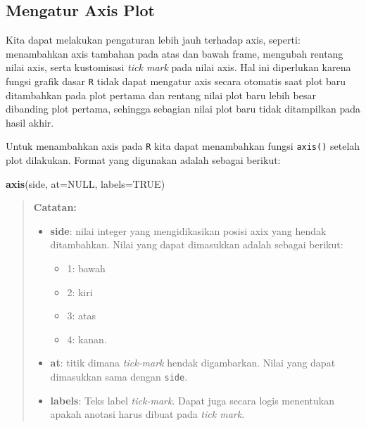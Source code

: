 \documentclass[
]{book}
\newenvironment{Shaded}{\begin{snugshade}}{\end{snugshade}}
\newcommand{\AttributeTok}[1]{\textcolor[rgb]{0.13,0.29,0.53}{#1}}
\newcommand{\ConstantTok}[1]{\textcolor[rgb]{0.56,0.35,0.01}{#1}}
\newcommand{\FunctionTok}[1]{\textcolor[rgb]{0.13,0.29,0.53}{\textbf{#1}}}
\newcommand{\NormalTok}[1]{#1}
\providecommand{\tightlist}{%
  \setlength{\itemsep}{0pt}\setlength{\parskip}{0pt}}
\theoremstyle{definition}
\theoremstyle{definition}
\theoremstyle{definition}
\theoremstyle{definition}
\theoremstyle{remark}
\begin{document}
\hypertarget{mengatur-axis-plot}{%
\subsection{Mengatur Axis Plot}\label{mengatur-axis-plot}}

Kita dapat melakukan pengaturan lebih jauh terhadap axis, seperti: menambahkan axis tambahan pada atas dan bawah frame, mengubah rentang nilai axis, serta kustomisasi \emph{tick mark} pada nilai axis. Hal ini diperlukan karena fungsi grafik dasar \texttt{R} tidak dapat mengatur axis secara otomatis saat plot baru ditambahkan pada plot pertama dan rentang nilai plot baru lebih besar dibanding plot pertama, sehingga sebagian nilai plot baru tidak ditampilkan pada hasil akhir.

Untuk menambahkan axis pada \texttt{R} kita dapat menambahkan fungsi \texttt{axis()} setelah plot dilakukan. Format yang digunakan adalah sebagai berikut:

\begin{Shaded}
\begin{Highlighting}[]
\FunctionTok{axis}\NormalTok{(side, }\AttributeTok{at=}\ConstantTok{NULL}\NormalTok{, }\AttributeTok{labels=}\ConstantTok{TRUE}\NormalTok{)}
\end{Highlighting}
\end{Shaded}

\begin{quote}
\textbf{Catatan:}

\begin{itemize}
\tightlist
\item
  \textbf{side}: nilai integer yang mengidikasikan posisi axix yang hendak ditambahkan. Nilai yang dapat dimasukkan adalah sebagai berikut:

  \begin{itemize}
  \tightlist
  \item
    1: bawah
  \item
    2: kiri
  \item
    3: atas
  \item
    4: kanan.
  \end{itemize}
\item
  \textbf{at}: titik dimana \emph{tick-mark} hendak digambarkan. Nilai yang dapat dimasukkan sama dengan \texttt{side}.
\item
  \textbf{labels}: Teks label \emph{tick-mark}. Dapat juga secara logis menentukan apakah anotasi harus dibuat pada \emph{tick mark}.
\end{itemize}
\end{quote}
\end{document}
